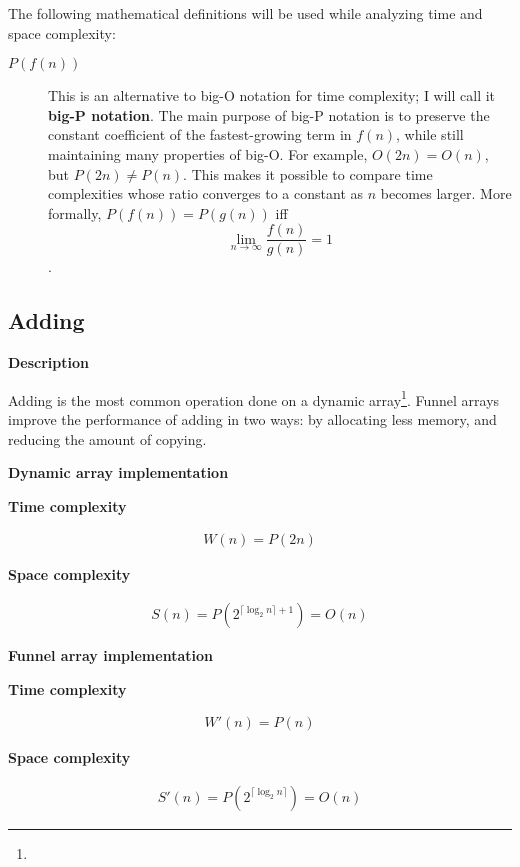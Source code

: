 \documentclass{article}
\newcommand{\descriptn}{\textbf{Description}}
\newcommand{\dynarrayimpl}{\textbf{Dynamic array implementation}}
\newcommand{\funarrayimpl}{\textbf{Funnel array implementation}}
\newcommand{\tcomplex}{\textbf{Time complexity}}
\newcommand{\scomplex}{\textbf{Space complexity}}
\newcommand{\spacefn}{S}
\newcommand{\nwritesfn}{W}
\newcommand{\spacenewfn}{\spacefn'}
\newcommand{\nwritesnewfn}{\nwritesfn'}
\newcommand{\bigo}{O}
\newcommand{\biggo}{P}
\newcommand{\varnitems}{n}
\begin{document}
	The following mathematical definitions will be used while analyzing time and space complexity:
	
	\begin{description}
		\item[$\biggo(f(n))$] This is an alternative to big-O notation for time complexity; I will call it \textbf{big-P notation}.
			\subitem The main purpose of big-P notation is to preserve the constant coefficient of the fastest-growing term in $f(n)$, while still maintaining many properties of big-O. For example, $\bigo(2n) = \bigo(n)$, but $\biggo(2n) \neq \biggo(n)$. This makes it possible to compare time complexities whose ratio converges to a constant as $n$ becomes larger.
			\subitem More formally, $\biggo(f(n)) = \biggo(g(n))$ iff $$\lim_{n \to \infty} {\frac{f(n)}{g(n)}} = 1$$.
	\end{description}
	
	\subsection{Adding}
	
	\descriptn
	
	Adding is the most common operation done on a dynamic array\footnote{}. Funnel arrays improve the performance of adding in two ways: by allocating less memory, and reducing the amount of copying.
	
	\dynarrayimpl
	
	\tcomplex
	
	\begin{align*}
	\nwritesfn(\varnitems) = \biggo(2\varnitems)
	\end{align*}
	
	\scomplex
	
	\begin{align*}
	\spacefn(\varnitems) = \biggo(2^{\lceil \log_2 \varnitems \rceil + 1}) = \bigo(\varnitems)
	\end{align*}
	
	\funarrayimpl
	
	\tcomplex
	
	\begin{align*}
	\nwritesnewfn(\varnitems) = \biggo(\varnitems)
	\end{align*}
	
	\scomplex
	
	\begin{align*}
	\spacenewfn(\varnitems) = \biggo(2^{\lceil \log_2 \varnitems \rceil}) = \bigo(\varnitems)
	\end{align*}
	
\end{document}
